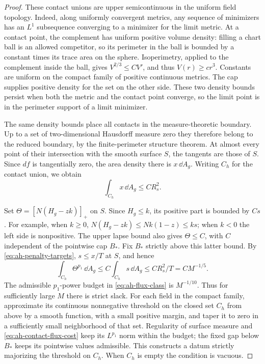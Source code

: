 \begin{proof}
These contact unions are upper semicontinuous in the
uniform field topology.  Indeed, along uniformly
convergent metrics, any sequence of minimizers has an
\(L^1\) subsequence converging to a minimizer for the
limit metric.  At a contact point, the complement has
uniform positive volume density: filling a chart ball
is an allowed competitor, so its perimeter in the ball
is bounded by a constant times its trace area on the
sphere.  Isoperimetry, applied to the complement inside
the ball, gives \(V^{2/3}\le CV'\), and thus
\(V(r)\ge cr^3\).  Constants are uniform on the compact
family of positive continuous metrics.  The cap supplies
positive density for the set on the other side.
These two density bounds persist when both the metric
and the contact point converge, so the limit point is
in the perimeter support of a limit minimizer.

The same density bounds place all contacts in the
measure-theoretic boundary.  Up to a set of
two-dimensional Hausdorff measure zero they therefore
belong to the reduced boundary, by the finite-perimeter
structure theorem.  At almost every point of their
intersection with the smooth surface \(S\), the tangents
are those of \(S\).  Since \(df\) is tangentially zero,
the area density there is \(x\,\dd A_g\).
Writing \(C_h\) for the contact union, we obtain
\begin{equation}\label{eq:ah-contact-area}
 \int_{C_h}x\,\dd A_g\le CR_s^2.
\end{equation}

Set \(\Theta=[N(H_g-zk)]_+\) on \(S\).
Since \(H_g\le k\), its positive part is bounded by \(Cs\).
For example, when \(k\ge0\),
\(N(H_g-zk)\le Nk(1-z)\le ks\); when \(k<0\)
the left side is nonpositive.  The upper lapse bound
also gives \(\Theta\le C\), with \(C\) independent of
the pointwise cap \(B_*\).  Fix \(B_*\) strictly above
this latter bound.  By \eqref{eq:ah-penalty-targets},
\(s\le x/T\) at \(S\), and hence
\begin{equation}\label{eq:ah-contact-flux-cost}
 \int_{C_h}\Theta^{p_1}\,\dd A_g
 \le C\int_{C_h}s\,\dd A_g
 \le C R_s^2/T=CM^{-1/5}.
\end{equation}
The admissible \(p_1\)-power budget in
\eqref{eq:ah-flux-class} is \(M^{-1/10}\).
Thus for sufficiently large \(M\) there is strict slack.
For each field in the compact family, approximate its
continuous nonnegative threshold on the closed set \(C_h\)
from above by a smooth function, with a small positive
margin, and taper it to zero in a sufficiently small
neighborhood of that set.  Regularity of surface measure
and \eqref{eq:ah-contact-flux-cost} keep its \(L^{p_1}\)
norm within the budget; the fixed gap below \(B_*\)
keeps its pointwise values admissible.  This constructs
a datum strictly majorizing the threshold on \(C_h\).
When \(C_h\) is empty the condition is vacuous.


\end{proof}
